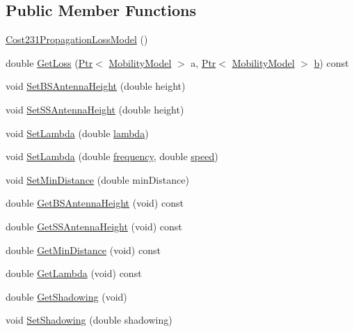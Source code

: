 \subsection*{Public Member Functions}
\begin{DoxyCompactItemize}
\item 
\hyperlink{classns3_1_1Cost231PropagationLossModel_a66a71d3fdabd10ff7a90a5447e656f47}{Cost231\+Propagation\+Loss\+Model} ()
\item 
double \hyperlink{classns3_1_1Cost231PropagationLossModel_adcd7815ef6c85c45565231142004f4e8}{Get\+Loss} (\hyperlink{classns3_1_1Ptr}{Ptr}$<$ \hyperlink{classns3_1_1MobilityModel}{Mobility\+Model} $>$ a, \hyperlink{classns3_1_1Ptr}{Ptr}$<$ \hyperlink{classns3_1_1MobilityModel}{Mobility\+Model} $>$ \hyperlink{lte__pathloss_8m_a21ad0bd836b90d08f4cf640b4c298e7c}{b}) const 
\item 
void \hyperlink{classns3_1_1Cost231PropagationLossModel_a269c0ae2011118bad16f3f42cebfba96}{Set\+B\+S\+Antenna\+Height} (double height)
\item 
void \hyperlink{classns3_1_1Cost231PropagationLossModel_aa81d481d48e1b68fead15693913ba016}{Set\+S\+S\+Antenna\+Height} (double height)
\item 
void \hyperlink{classns3_1_1Cost231PropagationLossModel_ab5be0ba1ebeca73c53733d978cbba9a1}{Set\+Lambda} (double \hyperlink{loss__ITU1411__NLOS__over__rooftop_8m_aca36b09d6e71a60cfa3837d7e24c07ca}{lambda})
\item 
void \hyperlink{classns3_1_1Cost231PropagationLossModel_ad4dd038e14498fba6dab7c6eb90dc53c}{Set\+Lambda} (double \hyperlink{mmwave_2model_2fading-traces_2fading__trace__generator_8m_a09045328d6d7e16aa4013f526cc6993d}{frequency}, double \hyperlink{mmwave-amc-test_8cc_a6dc6e6f3c75c509ce943163afb5dade7}{speed})
\item 
void \hyperlink{classns3_1_1Cost231PropagationLossModel_acd8ac9e94cfbf66e336d4c5930388c42}{Set\+Min\+Distance} (double min\+Distance)
\item 
double \hyperlink{classns3_1_1Cost231PropagationLossModel_a6b025b98d96367addd7c7ea14dcf62ee}{Get\+B\+S\+Antenna\+Height} (void) const 
\item 
double \hyperlink{classns3_1_1Cost231PropagationLossModel_ad47e8cc76c298b2121422d5e05957fe3}{Get\+S\+S\+Antenna\+Height} (void) const 
\item 
double \hyperlink{classns3_1_1Cost231PropagationLossModel_a4780acde1aebc6321f97648c067551e9}{Get\+Min\+Distance} (void) const 
\item 
double \hyperlink{classns3_1_1Cost231PropagationLossModel_a2873c8a29d3a39008429e70d62f569f0}{Get\+Lambda} (void) const 
\item 
double \hyperlink{classns3_1_1Cost231PropagationLossModel_a8ce8992b91da8805bb0739a03aecdaee}{Get\+Shadowing} (void)
\item 
void \hyperlink{classns3_1_1Cost231PropagationLossModel_a0d4d986bcb91e79833e41eae58f6e2a0}{Set\+Shadowing} (double shadowing)
\end{DoxyCompactItemize}
